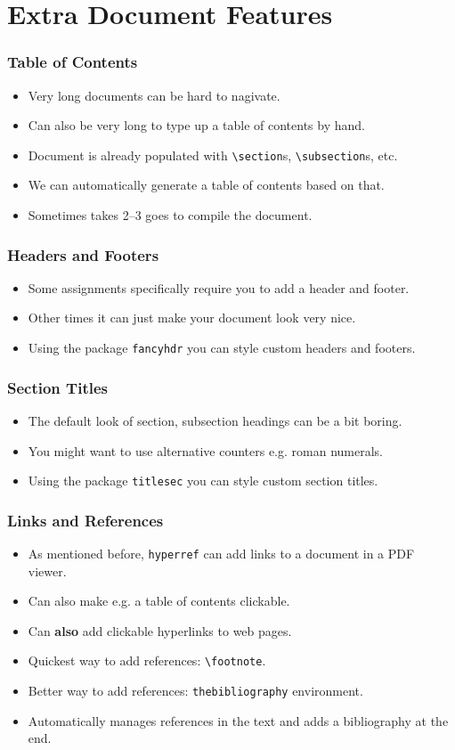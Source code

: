 \documentclass{beamer}
\begin{document}
\section{Extra Document Features}

\begin{frame}
	\frametitle{Table of Contents}
	\begin{itemize}
		\item Very long documents can be hard to nagivate.
		\item Can also be very long to type up a table of contents by hand.
		\item Document is already populated with \texttt{\textbackslash{}section}s, \texttt{\textbackslash{}subsection}s, etc.
		\item We can automatically generate a table of contents based on that.
		\item Sometimes takes 2--3 goes to compile the document.
	\end{itemize}
\end{frame}

\begin{frame}
	\frametitle{Headers and Footers}
	\begin{itemize}
		\item Some assignments specifically require you to add a header and footer.
		\item Other times it can just make your document look very nice.
		\item Using the package \texttt{fancyhdr} you can style custom headers and footers.
	\end{itemize}
\end{frame}

\begin{frame}
	\frametitle{Section Titles}
	\begin{itemize}
		\item The default look of section, subsection headings can be a bit boring.
		\item You might want to use alternative counters e.g. roman numerals.
		\item Using the package \texttt{titlesec} you can style custom section titles.
	\end{itemize}
\end{frame}

\begin{frame}
	\frametitle{Links and References}
	\begin{itemize}
		\item As mentioned before, \texttt{hyperref} can add links to a document in a PDF viewer.
		\item Can also make e.g. a table of contents clickable.
		\item Can \textbf{also} add clickable hyperlinks to web pages.
		\item Quickest way to add references: \texttt{\textbackslash{}footnote}.
		\item Better way to add references: \texttt{thebibliography} environment.
		\item Automatically manages references in the text and adds a bibliography at the end.
	\end{itemize}
\end{frame}
\end{document}
